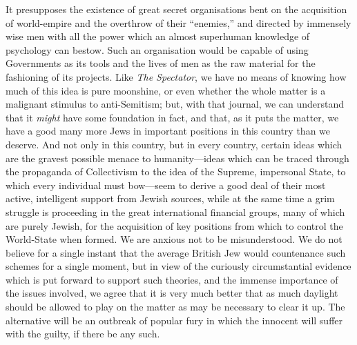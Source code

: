 \documentclass{book}
\begin{document}
It presupposes the existence of great secret organisations bent on the acquisition of world-empire and the overthrow of their “enemies,” and directed by immensely wise men with all the power which an almost superhuman knowledge of psychology can bestow. Such an organisation would be capable of using Governments as its tools and the lives of men as the raw material for the fashioning of its projects. Like \emph{The Spectator}, we have no means of knowing how much of this idea is pure moonshine, or even whether the whole matter is a malignant stimulus to anti-Semitism; but, with that journal, we can understand that it \emph{might} have some foundation in fact, and that, as it puts the matter, we have a good many more Jews in important positions in this country than we deserve. And not only in this country, but in every country, certain ideas which are the gravest possible menace to humanity—ideas which can be traced through the propaganda of Collectivism to the idea of the Supreme, impersonal State, to which every individual must bow—seem to derive a good deal of their most active, intelligent support from Jewish sources, while at the same time a grim struggle is proceeding in the great international financial groups, many of which are purely Jewish, for the acquisition of key positions from which to control the World-State when formed. We are anxious not to be misunderstood. We do not believe for a single instant that the average British Jew would countenance such schemes for a single moment, but in view of the curiously circumstantial evidence which is put forward to support such theories, and the immense importance of the issues involved, we agree that it is very much better that as much daylight should be allowed to play on the matter as may be necessary to clear it up. The alternative will be an outbreak of popular fury in which the innocent will suffer with the guilty, if there be any such.
\end{document}
